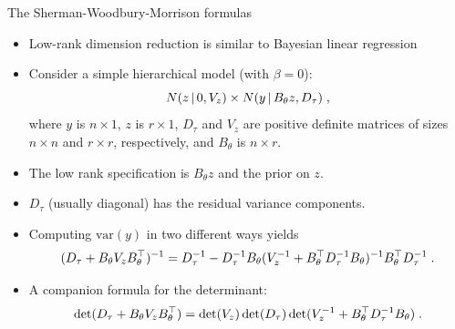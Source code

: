 \begin{frame}{The Sherman-Woodbury-Morrison formulas}

\begin{itemize}\setlength{\itemsep}{0.cm}
\item Low-rank dimension reduction is similar to Bayesian linear regression

\item Consider a simple hierarchical model (with $\beta = 0$):
\[
 N(z\,|\, 0, V_z) \times N(y\,|\, B_{\theta}z, D_{\tau})\; ,
\]
where $y$ is $n\times 1$, $z$ is $r\times 1$, $D_{\tau}$ and $V_z$ are positive definite matrices of sizes $n\times n$ and $r\times r$, respectively, and $B_{\theta}$ is $n\times r$.

\item The low rank specification is $B_{\theta}z$ and the prior on $z$.

\item $D_{\tau}$ (usually diagonal) has the residual variance components.

\item Computing $\mbox{var}(y)$ in two different ways yields
\[
 (D_{\tau} + B_{\theta}V_zB_{\theta}^{\top})^{-1} = D_{\tau}^{-1} - D_{\tau}^{-1}B_{\theta}(V_z^{-1} + B_{\theta}^{\top}D_{\tau}^{-1}B_{\theta})^{-1}B_{\theta}^{\top}D_{\tau}^{-1}\; .
\]

\item A companion formula for the determinant:
\[
 \det(D_{\tau} + B_{\theta}V_zB_{\theta}^{\top}) =  \det(V_z)\det(D_{\tau})\det(V_z^{-1} + B_{\theta}^{\top}D_{\tau}^{-1}B_{\theta})\;. 
\]

\end{itemize}

\end{frame}

